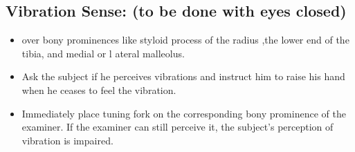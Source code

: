 \documentclass[a4paper,12pt,openany,oneside]{book}
\begin{document}
\subsection*{Vibration Sense: (to be done with eyes closed)}
\begin{itemize}
\item{over bony prominences like styloid process of the radius ,the lower end of the tibia, and medial or l ateral malleolus.}
\item{Ask the subject if he perceives vibrations and instruct him to raise his hand when he ceases to feel the vibration.}
\item{Immediately place tuning fork on the corresponding bony prominence of the examiner. If the examiner can still perceive it, the subject's perception of vibration is impaired.}
\end{itemize}
\end{document}

